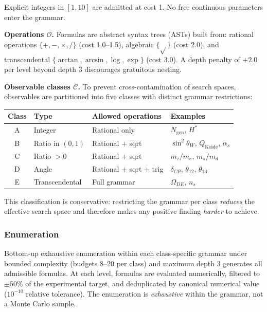 \documentclass[11pt,a4paper]{article}
\newcommand{\CP}{\mathrm{CP}}
\newcommand{\DE}{\mathrm{DE}}
\def\CP{CP}%
\def\DE{DE}%
\begin{document}
Explicit integers in $[1, 10]$ are admitted at cost 1. No free continuous parameters enter the grammar.

\textbf{Operations $\mathcal{O}$.} Formulas are abstract syntax trees (ASTs) built from: rational operations $\{+, -, \times, /\}$ (cost 1.0--1.5), algebraic $\{\sqrt{}\}$ (cost 2.0), and transcendental $\{\arctan, \arcsin, \log, \exp\}$ (cost 3.0). A depth penalty of $+2.0$ per level beyond depth 3 discourages gratuitous nesting.

\textbf{Observable classes $\mathcal{C}$.} To prevent cross-contamination of search spaces, observables are partitioned into five classes with distinct grammar restrictions:

\begin{table}[H]
\centering
\small
\begin{tabular}{clll}
\toprule
Class & Type & Allowed operations & Examples \\
\midrule
A & Integer & Rational only & $N_{\mathrm{gen}}$, $H^*$ \\
B & Ratio in $(0,1)$ & Rational + sqrt & $\sin^2\theta_W$, $Q_{\mathrm{Koide}}$, $\alpha_s$ \\
C & Ratio $> 0$ & Rational + sqrt & $m_\tau/m_e$, $m_s/m_d$ \\
D & Angle & Rational + sqrt + trig & $\delta_{\CP}$, $\theta_{12}$, $\theta_{13}$ \\
E & Transcendental & Full grammar & $\Omega_{\DE}$, $n_s$ \\
\bottomrule
\end{tabular}
\end{table}

This classification is conservative: restricting the grammar per class \textit{reduces} the effective search space and therefore makes any positive finding \textit{harder} to achieve.

\subsubsection{Enumeration}

Bottom-up exhaustive enumeration within each class-specific grammar under bounded complexity (budgets 8--20 per class) and maximum depth 3 generates all admissible formulas. At each level, formulas are evaluated numerically, filtered to $\pm 50\%$ of the experimental target, and deduplicated by canonical numerical value ($10^{-10}$ relative tolerance). The enumeration is \textit{exhaustive} within the grammar, not a Monte Carlo sample.
\end{document}

